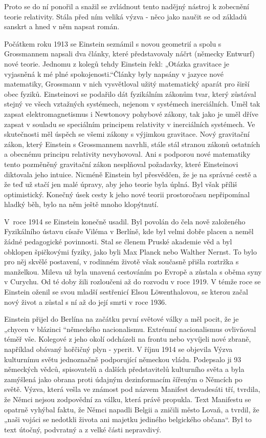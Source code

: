   Proto se do ní ponořil a snažil se zvládnout tento nadějný nástroj k zobecnění teorie relativity.
  Stála před ním veliká výzva - něco jako naučit se od základů sanskrt a hned v něm napsat román.
  
  Počátkem roku 1913 se Einstein seznámil s novou geometrií a spolu s Grossmannem napsali dva
  články, které představovaly náčrt (německy Entwurf) nové teorie. Jednomu z kolegů tehdy Einstein
  řekl: „Otázka gravitace je vyjasněná k mé plné spokojenosti.“Články byly napsány v jazyce nové
  matematiky, Grossmann v nich vysvětloval užitý matematický aparát pro širší obec fyziků.
  Einsteinovi se podařilo dát fyzikálním zákonům tvar, který zůstával stejný ve všech vztažných
  systémech, nejenom v systémech inerciálních. Uměl tak zapsat elektromagnetismus i Newtonovy
  pohybové zákony, tak jako je uměl dříve zapsat v souladu se speciálním principem relativity v
  inerciálních systémech. Ve skutečnosti měl úspěch se všemi zákony s výjimkou gravitace. Nový
  gravitační zákon, který Einstein s Grossmannem navrhli, stále stál stranou zákonů ostatních a
  obecnému principu relativity nevyhovoval. Ani s podporou nové matematiky tento pozměněný
  gravitační zákon nesplňoval požadavky, které Einsteinovi diktovala jeho intuice. Nicméně Einstein
  byl přesvědčen, že je na správné cestě a že teď už stačí jen malé úpravy, aby jeho teorie byla
  úplná. Byl však příliš optimistický. Konečný úsek cesty k jeho nové teorii prostoročasu
  nepřipomínal hladký běh, bylo na něm ještě mnoho klopýtnutí. 
  
  V roce 1914 se Einstein konečně usadil. Byl povolán do čela nově založeného Fyzikálního ústavu
  císaře Viléma v Berlíně, kde byl velmi dobře placen a neměl žádné pedagogické povinnosti. Stal se
  členem Pruské akademie věd a byl obklopen špičkovými fyziky, jako byli Max Planck nebo Walther
  Nernst. To bylo pro něj skvělé postavení, v rodinném životě však současně přišla roztržka s
  manželkou. Mileva už byla unavená cestováním po Evropě a zůstala s oběma syny v Curychu. Od té
  doby žili rozloučeni až do rozvodu v roce 1919. V témže roce se Einstein oženil se svou mladší
  sestřenicí Elsou Löwenthalovou, se kterou začal nový život a zůstal s ní až do její smrti v roce
  1936. 
  
  Einstein přijel do Berlína na začátku první světové války a měl pocit, že je „chycen v blázinci
  “německého nacionalismu. Extrémní nacionalismus ovlivňoval téměř vše. Kolegové z jeho okolí
  odcházeli na frontu nebo vyvíjeli nové zbraně, například obávaný hořčičný plyn - yperit. V říjnu
  1914 se objevila Výzva kulturnímu světu jednoznačně podporující německou vládu. Podepsalo ji 93
  německých vědců, spisovatelů a dalších představitelů kulturního světa a byla zamýšlená jako obrana
  proti údajným dezinformacím šířeným o Němcích po světě. Výzva, která vešla ve známost pod názvem
  Manifest devadesáti tří, tvrdila, že Němci nejsou zodpovědní za válku, která právě propukla. Text
  Manifestu se opatrně vyhýbal faktu, že Němci napadli Belgii a zničili město Lovaň, a tvrdil, že
  „naši vojáci se nedotkli života ani majetku jediného belgického občana“. Byl to text útočný,
  podvratný a z velké části nepravdivý. 
  
